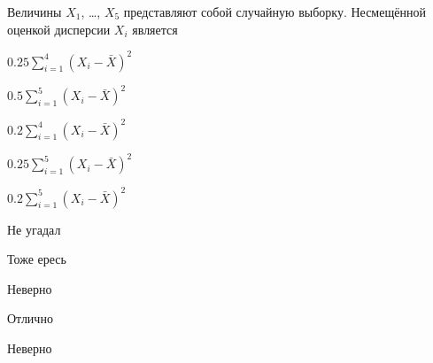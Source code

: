 
\begin{question}
Величины \(X_1\), \ldots, \(X_{5}\) представляют собой случайную
выборку. Несмещённой оценкой дисперсии \(X_i\) является
\begin{answerlist}
  \item \(0.25\sum_{i=1}^{4}(X_i - \bar X)^2\)
  \item \(0.5\sum_{i=1}^{5}(X_i - \bar X)^2\)
  \item \(0.2\sum_{i=1}^{4}(X_i - \bar X)^2\)
  \item \(0.25\sum_{i=1}^{5}(X_i - \bar X)^2\)
  \item \(0.2\sum_{i=1}^{5}(X_i - \bar X)^2\)
\end{answerlist}
\end{question}

\begin{solution}
\begin{answerlist}
  \item Не угадал
  \item Тоже ересь
  \item Неверно
  \item Отлично
  \item Неверно
\end{answerlist}
\end{solution}

